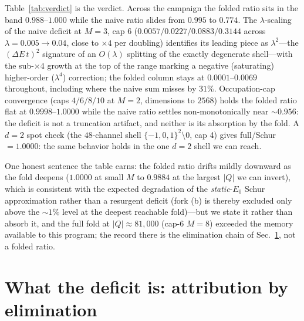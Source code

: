 \documentclass[11pt]{article}
\begin{document}
Table~\ref{tab:verdict} is the verdict. Across the campaign the
folded ratio sits in the band $0.988$--$1.000$ while the naive
ratio slides from $0.995$ to $0.774$. The $\lambda$-scaling of
the naive deficit at $M=3$, cap 6 ($0.0057/0.0227/0.0883/0.3144$ across
$\lambda=0.005\to0.04$, close to $\times4$ per doubling)
identifies its leading piece as $\lambda^2$---the $(\Delta E\,t)^2$
signature of an $O(\lambda)$ splitting of the exactly degenerate
shell---with the sub-$\times4$ growth at the top of the range
marking a negative (saturating) higher-order ($\lambda^4$) correction; the folded column stays at
$0.0001$--$0.0069$ throughout, including where the naive sum
misses by $31\%$. Occupation-cap convergence (caps $4/6/8/10$ at
$M=2$, dimensions to $2568$) holds the folded ratio flat at
$0.9998$--$1.0000$ while the naive ratio settles
non-monotonically near ${\sim}0.956$: the deficit is not a truncation artifact, and
neither is its absorption by the fold. A $d=2$ spot check (the
$48$-channel shell $\{-1,0,1\}^2\setminus0$, cap 4) gives
full/Schur $=1.0000$: the same behavior holds in the one $d=2$
shell we can reach.

One honest sentence the table earns: the folded ratio drifts
mildly downward as the fold deepens ($1.0000$ at small $M$ to
$0.9884$ at the largest $|Q|$ we can invert), which is
consistent with the expected degradation of the \emph{static}-$E_0$ Schur
approximation rather than a resurgent deficit (fork (b) is thereby
excluded only above the ${\sim}1\%$ level at the deepest reachable
fold)---but we state it rather
than absorb it, and the full fold at $|Q|\approx81{,}000$
(cap-6 $M=8$) exceeded the memory available to this program; the
record there is the elimination chain of
Sec.~\ref{sec:mechanism}, not a folded ratio.

\section{What the deficit is: attribution by elimination}
\label{sec:mechanism}
\end{document}
